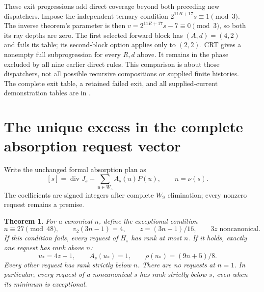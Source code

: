 \documentclass[11pt]{article}
\newtheorem{theorem}{Theorem}
\begin{document}
These exit progressions add direct coverage beyond both preceding new
dispatchers. Impose the independent ternary condition
$2^{11R+17}s\equiv1\pmod3$. The inverse theorem's parameter is then
$v=2^{11R+17}s-7\equiv0\pmod3$, so both its ray depths are zero.
The first selected forward block has $(A,d)=(4,2)$ and fails its table;
its second-block option applies only to $(2,2)$. CRT gives a nonempty
full subprogression for every $R,d$ above. It remains in the phase
excluded by all nine earlier direct rules. This comparison is about
those dispatchers, not all possible recursive compositions or supplied
finite histories. The complete exit table, a retained failed exit, and
all supplied-current demonstration tables are in
.

\section{The unique excess in the complete absorption request vector}
Write the unchanged formal absorption plan as
\[
 [s]=\operatorname{div}J_s+\sum_{u\in W_5}A_s(u)P(u),
 \qquad n=\nu(s).
\]
The coefficients are signed integers after complete $W_9$ elimination;
every nonzero request remains a premise.
\begin{theorem}\label{thm:exactabsorption}
For a canonical $n$, define the exceptional condition
\[
 n\equiv27\pmod{48},\qquad v_2(3n-1)=4,\qquad
 z=(3n-1)/16,\qquad 3z\text{ noncanonical}.
\]
If this condition fails, every request of $H_s$ has rank at most $n$.
If it holds, exactly one request has rank above $n$:
\[
 u_*=4z+1,\qquad A_s(u_*)=1,\qquad
 \rho(u_*)=(9n+5)/8.
\]
Every other request has rank strictly below $n$. There are no requests
at $n=1$. In particular, every request of a noncanonical $s$ has rank
strictly below $s$, even when its minimum is exceptional.
\end{theorem}
\end{document}
